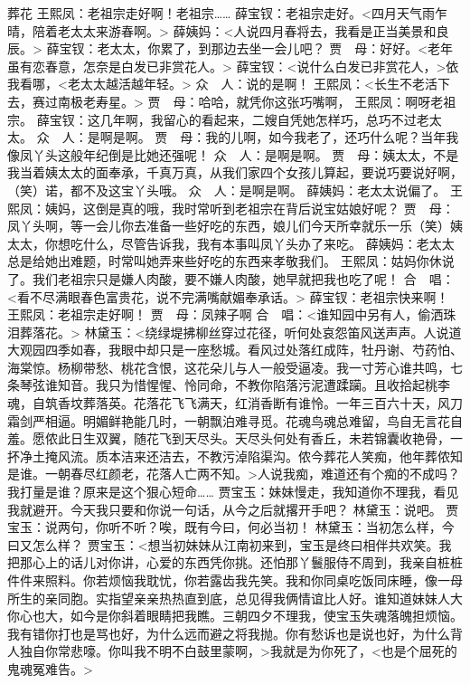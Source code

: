 \documentclass{article}
\begin{document}
葬花
王熙凤：老祖宗走好啊！老祖宗……
薛宝钗：老祖宗走好。<四月天气雨乍晴，陪着老太太来游春啊。>
薛姨妈：<人说四月春将去，我看是正当美景和良辰。>
薛宝钗：老太太，你累了，到那边去坐一会儿吧？
贾　母：好好。<老年虽有恋春意，怎奈是白发已非赏花人。>
薛宝钗：<说什么白发已非赏花人，>依我看哪，<老太太越活越年轻。>
众　人：说的是啊！
王熙凤：<长生不老活下去，赛过南极老寿星。>
贾　母：哈哈，就凭你这张巧嘴啊，
王熙凤：啊呀老祖宗。
薛宝钗：这几年啊，我留心的看起来，二嫂自凭她怎样巧，总巧不过老太太。
众　人：是啊是啊。
贾　母：我的儿啊，如今我老了，还巧什么呢？当年我像凤丫头这般年纪倒是比她还强呢！
众　人：是啊是啊。
贾　母：姨太太，不是我当着姨太太的面奉承，千真万真，从我们家四个女孩儿算起，要说巧要说好啊，（笑）诺，都不及这宝丫头哦。
众　人：是啊是啊。
薛姨妈：老太太说偏了。
王熙凤：姨妈，这倒是真的哦，我时常听到老祖宗在背后说宝姑娘好呢？
贾　母：凤丫头啊，等一会儿你去准备一些好吃的东西，娘儿们今天所幸就乐一乐（笑）姨太太，你想吃什么，尽管告诉我，我有本事叫凤丫头办了来吃。
薛姨妈：老太太总是给她出难题，时常叫她弄来些好吃的东西来孝敬我们。
王熙凤：姑妈你休说了。我们老祖宗只是嫌人肉酸，要不嫌人肉酸，她早就把我也吃了呢！
合　唱：<看不尽满眼春色富贵花，说不完满嘴献媚奉承话。>
薛宝钗：老祖宗快来啊！
王熙凤：老祖宗走好啊！
贾　母：凤辣子啊
合　唱：<谁知园中另有人，偷洒珠泪葬落花。>
林黛玉：<绕绿堤拂柳丝穿过花径，听何处哀怨笛风送声声。人说道大观园四季如春，我眼中却只是一座愁城。看风过处落红成阵，牡丹谢、芍药怕、海棠惊。杨柳带愁、桃花含恨，这花朵儿与人一般受逼凌。我一寸芳心谁共鸣，七条琴弦谁知音。我只为惜惺惺、怜同命，不教你陷落污泥遭蹂躏。且收拾起桃李魂，自筑香坟葬落英。花落花飞飞满天，红消香断有谁怜。一年三百六十天，风刀霜剑严相逼。明媚鲜艳能几时，一朝飘泊难寻觅。花魂鸟魂总难留，鸟自无言花自羞。愿侬此日生双翼，随花飞到天尽头。天尽头何处有香丘，未若锦囊收艳骨，一抔净土掩风流。质本洁来还洁去，不教污淖陷渠沟。侬今葬花人笑痴，他年葬侬知是谁。一朝春尽红颜老，花落人亡两不知。>人说我痴，难道还有个痴的不成吗？我打量是谁？原来是这个狠心短命……
贾宝玉：妹妹慢走，我知道你不理我，看见我就避开。今天我只要和你说一句话，从今之后就撂开手吧？
林黛玉：说吧。
贾宝玉：说两句，你听不听？唉，既有今曰，何必当初！
林黛玉：当初怎么样，今曰又怎么样？
贾宝玉：<想当初妹妹从江南初来到，宝玉是终曰相伴共欢笑。我把那心上的话儿对你讲，心爱的东西凭你挑。还怕那丫鬟服侍不周到，我亲自桩桩件件来照料。你若烦恼我耽忧，你若露齿我先笑。我和你同桌吃饭同床睡，像一母所生的亲同胞。实指望亲亲热热直到底，总见得我俩情谊比人好。谁知道妹妹人大你心也大，如今是你斜着眼睛把我瞧。三朝四夕不理我，使宝玉失魂落魄担烦恼。我有错你打也是骂也好，为什么远而避之将我抛。你有愁诉也是说也好，为什么背人独自你常悲嚎。你叫我不明不白鼓里蒙啊，>我就是为你死了，<也是个屈死的鬼魂冤难告。>
\end{document}
